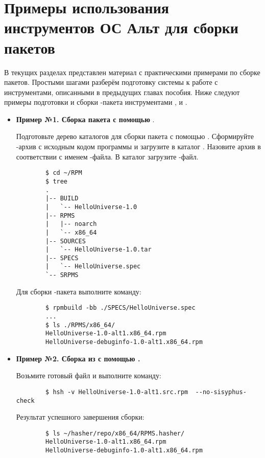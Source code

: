 \chapter{Примеры использования инструментов ОС Альт для сборки пакетов}

В текущих разделах представлен материал с практическими примерами по сборке пакетов. Простыми шагами разберём подготовку системы к работе с инструментами, описанными в предыдущих главах пособия. Ниже следуют примеры подготовки и сборки -пакета инструментами ,  и .

\begin{itemize}
	\item \textbf{Пример №1. Сборка пакета с помощью }.
	
	Подготовьте дерево каталогов для сборки пакета с помощью . Сформируйте -архив с исходным кодом программы и загрузите в каталог . Назовите архив в соответствии с именем -файла. В каталог  загрузите -файл. 
	
	\begin{verbatim}
		$ cd ~/RPM
		$ tree
		.
		|-- BUILD
		|   `-- HelloUniverse-1.0
		|-- RPMS
		|   |-- noarch
		|   `-- x86_64
		|-- SOURCES
		|   `-- HelloUniverse-1.0.tar
		|-- SPECS
		|   `-- HelloUniverse.spec
		`-- SRPMS
	\end{verbatim}
	
	Для сборки -пакета выполните команду: 
	\begin{verbatim}
		$ rpmbuild -bb ./SPECS/HelloUniverse.spec 
		...
		$ ls ./RPMS/x86_64/
		HelloUniverse-1.0-alt1.x86_64.rpm
		HelloUniverse-debuginfo-1.0-alt1.x86_64.rpm
	\end{verbatim}
	
	\item \textbf{Пример №2. Сборка из  с помощью .}
	
	Возьмите готовый файл  и выполните команду:
	\begin{verbatim}
		$ hsh -v HelloUniverse-1.0-alt1.src.rpm  --no-sisyphus-check
	\end{verbatim} 
	
	Результат успешного завершения сборки: 
	\begin{verbatim}
		$ ls ~/hasher/repo/x86_64/RPMS.hasher/
		HelloUniverse-1.0-alt1.x86_64.rpm
		HelloUniverse-debuginfo-1.0-alt1.x86_64.rpm
	\end{verbatim}
	

\end{itemize}
